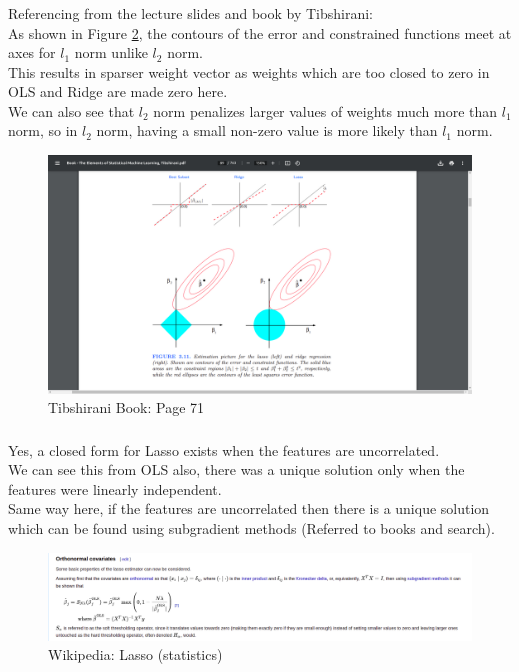 \documentclass[12pt, fleqn]{article}
\begin{document}
\subsubsection{}
Referencing from the lecture slides and book by Tibshirani: \\
As shown in Figure \ref{tibs}, the contours of the error and constrained functions meet at axes for $l_1$ norm unlike $l_2$ norm. \\
This results in sparser weight vector as weights which are too closed to zero in OLS and Ridge are made zero here. \\
We can also see that $l_2$ norm penalizes larger values of weights much more than $l_1$ norm, so in $l_2$ norm, having a small non-zero value is more likely than $l_1$ norm.
\begin{figure}[H]
  \centering
  \includegraphics[scale=0.25]{tibshirani_l1_l2.png}
  \caption{Tibshirani Book: Page 71}
  \label{tibs}
\end{figure}

\subsubsection{}
Yes, a closed form for Lasso exists when the features are uncorrelated. \\
We can see this from OLS also, there was a unique solution only when the features were linearly independent. \\
Same way here, if the features are uncorrelated then there is a unique solution which can be found using subgradient methods (Referred to books and search). \\
\begin{figure}[H]
  \centering
  \includegraphics[scale=0.3]{wikipedia_lasso.png}
  \caption{Wikipedia: Lasso (statistics)}
  \label{tibs}
\end{figure}
\end{document}
